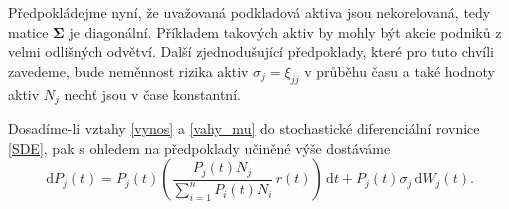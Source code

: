 \documentclass[a4paper,12pt]{report}
\theoremstyle{definition} \newtheorem{definice}[veta]{Definice}
\theoremstyle{remark}
\begin{document}
Předpokládejme nyní, že uvažovaná podkladová aktiva jsou nekorelovaná, tedy matice $\boldsymbol{\Sigma}$ je diagonální.
Příkladem takových aktiv by mohly být akcie podniků z velmi odlišných odvětví.
Další zjednodušující předpoklady, které pro tuto chvíli zavedeme, bude neměnnost rizika aktiv $\sigma_j=\xi_{jj}$ v průběhu času a také hodnoty aktiv $N_j$ nechť jsou v čase konstantní.

Dosadíme-li vztahy \eqref{vynos} a \eqref{vahy_mu} do stochastické diferenciální rovnice \eqref{SDE}, pak s ohledem na předpoklady učiněné výše dostáváme
\begin{equation} 
\mathrm{d}P_j(t)=P_j(t)\left(\frac{P_j(t)N_j}{\sum_{i=1}^n P_i(t)N_i}\, r(t)\right)\,\mathrm{d}t+P_j(t)\sigma_{j}\,\mathrm{d}W_j(t).
\end{equation}
\end{document}

